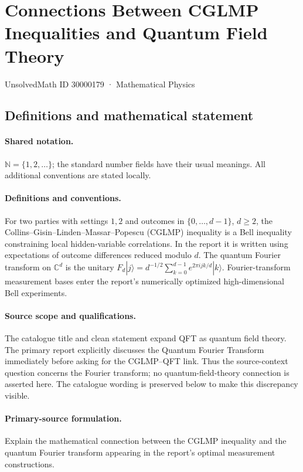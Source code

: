 \documentclass[11pt]{article}
\begin{document}
\setcounter{section}{30000178}
\section{Connections Between CGLMP Inequalities and Quantum Field Theory}\label{30000179}
{\small UnsolvedMath ID 30000179 · Mathematical Physics}
\subsection{Definitions and mathematical statement}

\paragraph{Shared notation.}$\mathbb N=\{1,2,\ldots\}$; the standard number fields have their usual meanings. All additional conventions are stated locally.


\paragraph{Definitions and conventions.} For two parties with settings $1,2$ and outcomes in $\{0,\ldots,d-1\}$, $d\ge2$, the Collins--Gisin--Linden--Massar--Popescu (CGLMP) inequality is a Bell inequality constraining local hidden-variable correlations. In the report it is written using expectations of outcome differences reduced modulo $d$. The quantum Fourier transform on $\mathbb C^d$ is the unitary $F_d|j\rangle=d^{-1/2}\sum_{k=0}^{d-1}e^{2\pi ijk/d}|k\rangle$. Fourier-transform measurement bases enter the report's numerically optimized high-dimensional Bell experiments.

\paragraph{Source scope and qualifications.} The catalogue title and clean statement expand QFT as quantum field theory. The primary report explicitly discusses the Quantum Fourier Transform immediately before asking for the CGLMP--QFT link. Thus the source-context question concerns the Fourier transform; no quantum-field-theory connection is asserted here. The catalogue wording is preserved below to make this discrepancy visible.

\paragraph{Primary-source formulation.} Explain the mathematical connection between the CGLMP inequality and the quantum Fourier transform appearing in the report's optimal measurement constructions.
\end{document}
